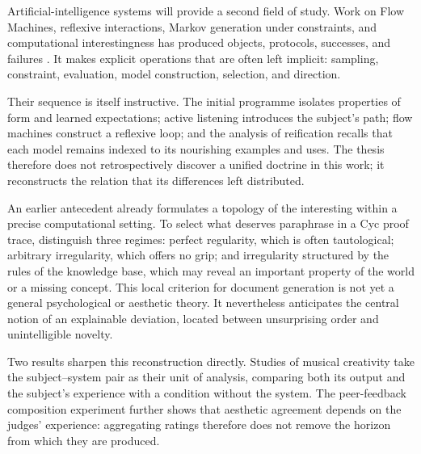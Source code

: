 \documentclass[11pt,a4paper]{article}
\begin{document}
Artificial-intelligence systems will provide a second field of study. Work on Flow
Machines, reflexive interactions, Markov generation under constraints, and
computational interestingness has produced objects, protocols, successes, and
failures
\parencite{pachet1999surprising,pachet1999active,pachet1999programs,pachet2000melodie,
pachet2002continuatorinteraction,pachet2004flowmachines,pachet2004reification,
pachet2004cybernetic,pachet2004childrenreflect,addessi2005experiments,
pachet2006clefs,pachet2006creativity,pachet2006reflective,pachet2008machines,
jones2009stimulating,pachet2006interactionsreflexives,addessi2006flowmachine,
aucouturier2002similarity,pachetroy2008hitsong,pachet2011hitsong,
lerch2011closedloop,
milipachet1995regularity,pachet2012virtuosity,martin2016creativeprocess,
pachet2021assisted,pachet2026markov}.
It makes explicit operations that are often left implicit: sampling,
constraint, evaluation, model construction, selection, and direction.

Their sequence is itself instructive. The initial programme isolates properties
of form and learned expectations; active listening introduces the subject's
path; flow machines construct a reflexive loop; and the analysis of reification
recalls that each model remains indexed to its nourishing examples and uses. The
thesis therefore does not retrospectively discover a unified doctrine in this
work; it reconstructs the relation that its differences left distributed.

An earlier antecedent already formulates a topology of the interesting within a
precise computational setting. To select what deserves paraphrase in a Cyc proof
trace, \textcite{milipachet1995regularity} distinguish three regimes: perfect
regularity, which is often tautological; arbitrary irregularity, which offers no
grip; and irregularity structured by the rules of the knowledge base, which may
reveal an important property of the world or a missing concept. This local
criterion for document generation is not yet a general psychological or
aesthetic theory. It nevertheless anticipates the central notion of an
explainable deviation, located between unsurprising order and unintelligible
novelty.

Two results sharpen this reconstruction directly. Studies of musical creativity
take the subject--system pair as their unit of analysis, comparing both its output
and the subject's experience with a condition without the system. The peer-feedback
composition experiment further shows that aesthetic agreement depends on the judges'
experience: aggregating ratings therefore does not remove the horizon from which they
are produced.
\end{document}
